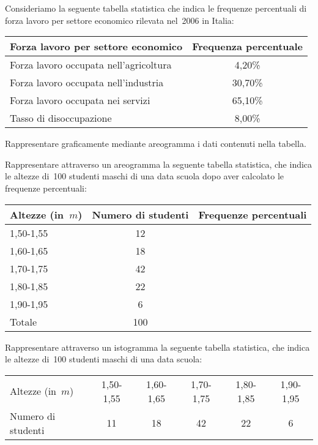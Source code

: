\begin{esercizio}
\label{ese:A.17}
Consideriamo la seguente tabella statistica che indica le frequenze 
percentuali di forza lavoro per settore economico rilevata nel~2006 in 
Italia:
\begin{center}
\begin{tabular}{lc}
\toprule
Forza lavoro per settore economico & Frequenza percentuale\\
\midrule
Forza lavoro occupata nell'agricoltura & 4,20\%\\
Forza lavoro occupata nell'industria & 30,70\%\\
Forza lavoro occupata nei servizi & 65,10\%\\
Tasso di disoccupazione & 8,00\%\\
\bottomrule
\end{tabular}
\end{center}
Rappresentare graficamente mediante areogramma i dati contenuti nella 
tabella.
\end{esercizio}

\begin{esercizio}
\label{ese:A.18}
Rappresentare attraverso un areogramma la seguente tabella statistica, che 
indica le altezze di~100 studenti maschi
di una data scuola dopo aver calcolato le frequenze percentuali:
\begin{center}
\begin{tabular}{l*{2}{c}}
\toprule
Altezze (in~$\unit{m}$) & Numero di studenti & Frequenze percentuali\\
\midrule
1,50-1,55 & 12 & \\
1,60-1,65 & 18 & \\
1,70-1,75 & 42 & \\
1,80-1,85 & 22 & \\
1,90-1,95 & 6 & \\
\midrule
Totale & 100 & \\
\bottomrule
\end{tabular}
\end{center}

\end{esercizio}

\begin{esercizio}
\label{ese:A.19}
Rappresentare attraverso un istogramma la seguente tabella statistica, che 
indica le altezze di~100 studenti maschi di una data scuola:
\begin{center}
\begin{tabular}{l*{5}{c}}
\toprule
Altezze (in~$\unit{m}$) & 1,50-1,55 & 1,60-1,65 & 1,70-1,75 & 1,80-1,85 & 
1,90-1,95\\
Numero di studenti & 11 & 18 & 42 & 22 & 6 \\
\bottomrule
\end{tabular}
\end{center}
\end{esercizio}

